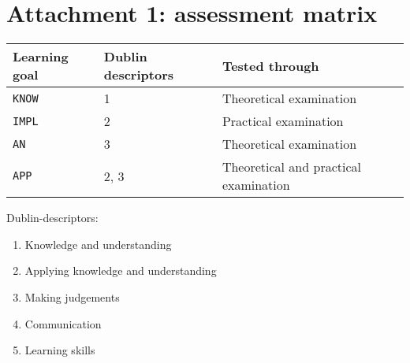 \section*{Attachment 1: assessment matrix}
	\begin{tabular}{|p{3cm}|p{3.5cm}|p{6cm}|}
		\hline
		\textbf{Learning goal} & \textbf{Dublin descriptors} & \textbf{Tested through} \\
		\hline
		\texttt{KNOW} & 1 & Theoretical examination \\
		\hline
		\texttt{IMPL} & 2 & Practical examination \\
		\hline
		\texttt{AN} & 3 & Theoretical examination \\
		\hline
		\texttt{APP} & 2, 3 & Theoretical and practical examination \\
		\hline
	\end{tabular}
	
	\vspace{1cm}

	Dublin-descriptors:
	\begin{enumerate}
		\item Knowledge and understanding
		\item Applying knowledge and understanding
		\item Making judgements
		\item Communication
		\item Learning skills
	\end{enumerate}
